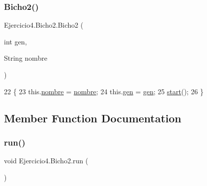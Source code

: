 \subsubsection{\texorpdfstring{Bicho2()}{Bicho2()}}
{\footnotesize\ttfamily Ejercicio4.\+Bicho2.\+Bicho2 (\begin{DoxyParamCaption}\item[{int}]{gen,  }\item[{String}]{nombre }\end{DoxyParamCaption})\hspace{0.3cm}{\ttfamily [inline]}}


\begin{DoxyCode}
22                                           \{
23         this.\mbox{\hyperlink{class_ejercicio4_1_1_bicho2_a2afa745208a498ecffc1b2843bc0da82}{nombre}} = \mbox{\hyperlink{class_ejercicio4_1_1_bicho2_a2afa745208a498ecffc1b2843bc0da82}{nombre}};
24         this.\mbox{\hyperlink{class_ejercicio4_1_1_bicho2_a52c8486d264ae216ff0dd1d6c08f8916}{gen}} = \mbox{\hyperlink{class_ejercicio4_1_1_bicho2_a52c8486d264ae216ff0dd1d6c08f8916}{gen}};
25         \mbox{\hyperlink{namespaceejemplo_1_1clase_abcf43191f0ecf3b071ca2db7696ba821}{start}}();
26     \}
\end{DoxyCode}


\subsection{Member Function Documentation}
\mbox{\label{class_ejercicio4_1_1_bicho2_aae5ca96ca417369d0f5c05daf12fe3c5}} 
\subsubsection{\texorpdfstring{run()}{run()}}
{\footnotesize\ttfamily void Ejercicio4.\+Bicho2.\+run (\begin{DoxyParamCaption}{ }\end{DoxyParamCaption})\hspace{0.3cm}{\ttfamily [inline]}}


